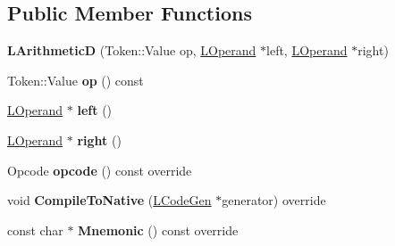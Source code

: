 \subsection*{Public Member Functions}
\begin{DoxyCompactItemize}
\item 
{\bfseries L\+ArithmeticD} (Token\+::\+Value op, \hyperlink{classv8_1_1internal_1_1_l_operand}{L\+Operand} $\ast$left, \hyperlink{classv8_1_1internal_1_1_l_operand}{L\+Operand} $\ast$right)\hypertarget{classv8_1_1internal_1_1_l_arithmetic_d_aad5c45947dcad72abbbcd55b081f4e6e}{}\label{classv8_1_1internal_1_1_l_arithmetic_d_aad5c45947dcad72abbbcd55b081f4e6e}

\item 
Token\+::\+Value {\bfseries op} () const \hypertarget{classv8_1_1internal_1_1_l_arithmetic_d_a0689ba0a4deee0bb4450bb0fdc7f877b}{}\label{classv8_1_1internal_1_1_l_arithmetic_d_a0689ba0a4deee0bb4450bb0fdc7f877b}

\item 
\hyperlink{classv8_1_1internal_1_1_l_operand}{L\+Operand} $\ast$ {\bfseries left} ()\hypertarget{classv8_1_1internal_1_1_l_arithmetic_d_a8d143eb5deb9725b2544b7ecc1a6b7aa}{}\label{classv8_1_1internal_1_1_l_arithmetic_d_a8d143eb5deb9725b2544b7ecc1a6b7aa}

\item 
\hyperlink{classv8_1_1internal_1_1_l_operand}{L\+Operand} $\ast$ {\bfseries right} ()\hypertarget{classv8_1_1internal_1_1_l_arithmetic_d_ad78701fa7af5138fc5a741a1ceed96a7}{}\label{classv8_1_1internal_1_1_l_arithmetic_d_ad78701fa7af5138fc5a741a1ceed96a7}

\item 
Opcode {\bfseries opcode} () const  override\hypertarget{classv8_1_1internal_1_1_l_arithmetic_d_a6371d86c37944a1a90b2e4778d0b7024}{}\label{classv8_1_1internal_1_1_l_arithmetic_d_a6371d86c37944a1a90b2e4778d0b7024}

\item 
void {\bfseries Compile\+To\+Native} (\hyperlink{classv8_1_1internal_1_1_l_code_gen}{L\+Code\+Gen} $\ast$generator) override\hypertarget{classv8_1_1internal_1_1_l_arithmetic_d_a87834ef9f5e37f8ade4c8e8ef4284572}{}\label{classv8_1_1internal_1_1_l_arithmetic_d_a87834ef9f5e37f8ade4c8e8ef4284572}

\item 
const char $\ast$ {\bfseries Mnemonic} () const  override\hypertarget{classv8_1_1internal_1_1_l_arithmetic_d_a4e946b40f47ee99cc0015b108e983904}{}\label{classv8_1_1internal_1_1_l_arithmetic_d_a4e946b40f47ee99cc0015b108e983904}


\end{DoxyCompactItemize}

